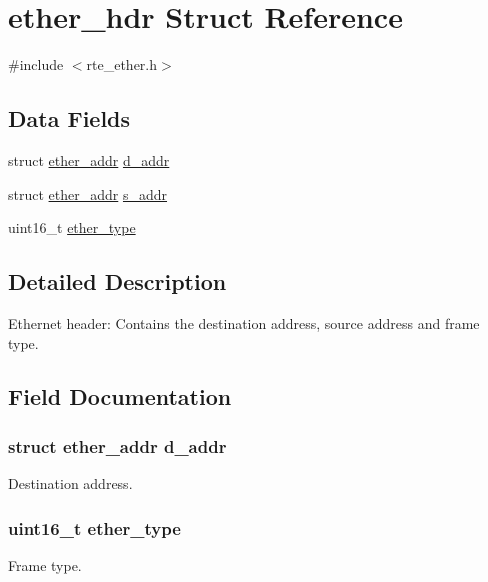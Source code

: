\hypertarget{structether__hdr}{}\section{ether\+\_\+hdr Struct Reference}
\label{structether__hdr}


{\ttfamily \#include $<$rte\+\_\+ether.\+h$>$}

\subsection*{Data Fields}
\begin{DoxyCompactItemize}
\item 
struct \hyperlink{structether__addr}{ether\+\_\+addr} \hyperlink{structether__hdr_a48d4fb059dd0fcb99a47a890dc1c10f0}{d\+\_\+addr}
\item 
struct \hyperlink{structether__addr}{ether\+\_\+addr} \hyperlink{structether__hdr_a10047aa0ea4caae2a392e4d5850deb6f}{s\+\_\+addr}
\item 
uint16\+\_\+t \hyperlink{structether__hdr_ad6312397ccc57d322b1a037c7080d340}{ether\+\_\+type}
\end{DoxyCompactItemize}


\subsection{Detailed Description}
Ethernet header\+: Contains the destination address, source address and frame type. 

\subsection{Field Documentation}
\hypertarget{structether__hdr_a48d4fb059dd0fcb99a47a890dc1c10f0}{}
\subsubsection[{d\+\_\+addr}]{\setlength{\rightskip}{0pt plus 5cm}struct {\bf ether\+\_\+addr} d\+\_\+addr}\label{structether__hdr_a48d4fb059dd0fcb99a47a890dc1c10f0}
Destination address. \hypertarget{structether__hdr_ad6312397ccc57d322b1a037c7080d340}{}
\subsubsection[{ether\+\_\+type}]{\setlength{\rightskip}{0pt plus 5cm}uint16\+\_\+t ether\+\_\+type}\label{structether__hdr_ad6312397ccc57d322b1a037c7080d340}
Frame type. \hypertarget{structether__hdr_a10047aa0ea4caae2a392e4d5850deb6f}{}
